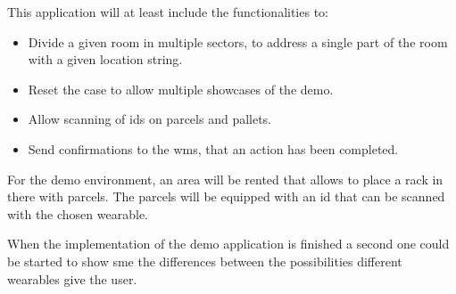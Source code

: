 This application will at least include the functionalities to:
\begin{itemize}
	\item Divide a given room in multiple sectors, to address a single part of the room with a given location string.
	\item Reset the case to allow multiple showcases of the demo.
	\item Allow scanning of \gls{id}s on \gls{parcel}s and pallets.
	\item Send confirmations to the \gls{wms}, that an action has been completed.
\end{itemize}

For the demo environment, an area will be rented that allows to place a rack in there with \gls{parcel}s. The \gls{parcel}s will be equipped with an \gls{id} that can be scanned with the chosen wearable.

When the implementation of the demo application is finished a second one could be started to show \gls{sme} the differences between the possibilities different wearables give the user.
